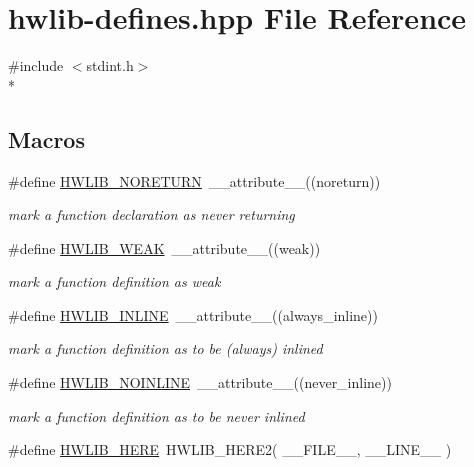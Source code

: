 \hypertarget{hwlib-defines_8hpp}{}\section{hwlib-\/defines.hpp File Reference}
\label{hwlib-defines_8hpp}
{\ttfamily \#include $<$stdint.\+h$>$}\\*
\subsection*{Macros}
\begin{DoxyCompactItemize}
\item 
\#define \hyperlink{hwlib-defines_8hpp_aef311f1f416fdcbd1fa22376dcc01029}{H\+W\+L\+I\+B\+\_\+\+N\+O\+R\+E\+T\+U\+RN}~\+\_\+\+\_\+attribute\+\_\+\+\_\+((noreturn))
\begin{DoxyCompactList}\small\item\em mark a function declaration as never returning \end{DoxyCompactList}\item 
\#define \hyperlink{hwlib-defines_8hpp_a04be4340016df60d6636c1d1c6d94fc9}{H\+W\+L\+I\+B\+\_\+\+W\+E\+AK}~\+\_\+\+\_\+attribute\+\_\+\+\_\+((weak))
\begin{DoxyCompactList}\small\item\em mark a function definition as weak \end{DoxyCompactList}\item 
\#define \hyperlink{hwlib-defines_8hpp_a520a8905adc71f1757aea4ce05183585}{H\+W\+L\+I\+B\+\_\+\+I\+N\+L\+I\+NE}~\+\_\+\+\_\+attribute\+\_\+\+\_\+((always\+\_\+inline))
\begin{DoxyCompactList}\small\item\em mark a function definition as to be (always) inlined \end{DoxyCompactList}\item 
\#define \hyperlink{hwlib-defines_8hpp_a2bec10dcdff9c6b29f603813007f2ffa}{H\+W\+L\+I\+B\+\_\+\+N\+O\+I\+N\+L\+I\+NE}~\+\_\+\+\_\+attribute\+\_\+\+\_\+((never\+\_\+inline))
\begin{DoxyCompactList}\small\item\em mark a function definition as to be never inlined \end{DoxyCompactList}\item 
\#define \hyperlink{hwlib-defines_8hpp_a360fe3b1713068844a760bed1aa1384a}{H\+W\+L\+I\+B\+\_\+\+H\+E\+RE}~H\+W\+L\+I\+B\+\_\+\+H\+E\+R\+E2( \+\_\+\+\_\+\+F\+I\+L\+E\+\_\+\+\_\+, \+\_\+\+\_\+\+L\+I\+N\+E\+\_\+\+\_\+ )

\end{DoxyCompactItemize}

